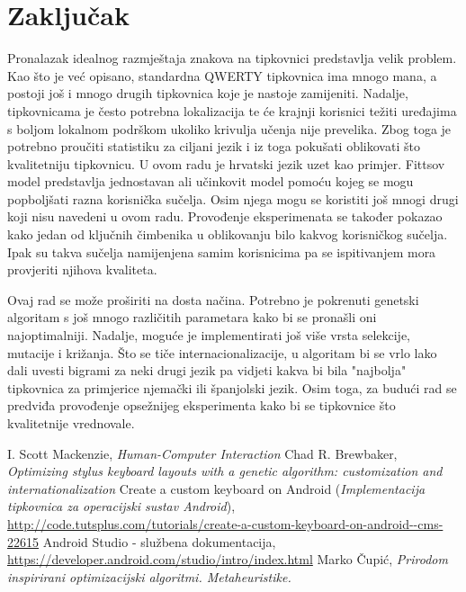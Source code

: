 \documentclass[times, utf8, zavrsni, numeric]{fer}
\begin{document}
\chapter{Zaključak}
Pronalazak idealnog razmještaja znakova na tipkovnici predstavlja velik problem. Kao što je već opisano, standardna QWERTY tipkovnica ima mnogo mana, a postoji još i mnogo drugih tipkovnica koje je nastoje zamijeniti. Nadalje, tipkovnicama je često potrebna lokalizacija te će krajnji korisnici težiti uređajima s boljom lokalnom podrškom ukoliko krivulja učenja  nije prevelika. Zbog toga je potrebno proučiti statistiku za ciljani jezik i iz toga pokušati oblikovati što kvalitetniju tipkovnicu. U ovom radu je hrvatski jezik uzet kao primjer. Fittsov model predstavlja jednostavan ali učinkovit model pomoću kojeg se mogu popboljšati razna korisnička sučelja. Osim njega mogu se koristiti još mnogi drugi koji nisu navedeni u ovom radu. Provođenje eksperimenata se također pokazao kako jedan od ključnih čimbenika u oblikovanju bilo kakvog korisničkog sučelja. Ipak su takva sučelja namijenjena samim korisnicima pa se ispitivanjem mora provjeriti njihova kvaliteta.

Ovaj rad se može proširiti na dosta načina. Potrebno je pokrenuti genetski algoritam s još mnogo različitih parametara kako bi se pronašli oni najoptimalniji. Nadalje, moguće je implementirati još više vrsta selekcije, mutacije i križanja. Što se tiče internacionalizacije, u algoritam bi se vrlo lako dali uvesti bigrami za neki drugi jezik pa vidjeti kakva bi bila "najbolja" tipkovnica za primjerice njemački ili španjolski jezik. Osim toga, za budući rad se predviđa provođenje opsežnijeg eksperimenta kako bi se tipkovnice što kvalitetnije vrednovale.

\begin{thebibliography}{9}
I. Scott Mackenzie, \emph{Human-Computer Interaction}
Chad R. Brewbaker, \emph{Optimizing stylus keyboard layouts with a genetic algorithm: customization and internationalization}
Create a custom keyboard on Android (\emph{Implementacija tipkovnica za operacijski sustav Android}), \url{http://code.tutsplus.com/tutorials/create-a-custom-keyboard-on-android--cms-22615}
Android Studio - službena dokumentacija, \url{https://developer.android.com/studio/intro/index.html}
Marko Čupić, \emph{Prirodom inspirirani optimizacijski algoritmi. Metaheuristike.}
\end{thebibliography}
\end{document}
